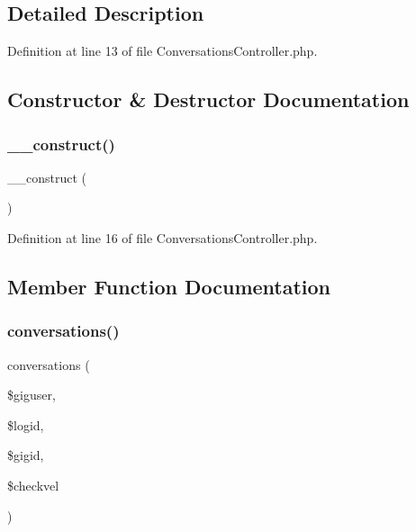 \subsection{Detailed Description}


Definition at line 13 of file Conversations\+Controller.\+php.



\subsection{Constructor \& Destructor Documentation}
\mbox{\label{class_responsive_1_1_http_1_1_controllers_1_1_conversations_controller_a095c5d389db211932136b53f25f39685}} 
\subsubsection{\texorpdfstring{\_\_construct()}{\_\_construct()}}
{\footnotesize\ttfamily \+\_\+\+\_\+construct (\begin{DoxyParamCaption}{ }\end{DoxyParamCaption})}



Definition at line 16 of file Conversations\+Controller.\+php.



\subsection{Member Function Documentation}
\mbox{\label{class_responsive_1_1_http_1_1_controllers_1_1_conversations_controller_a485a3199a3b013918780405a40c2a22a}} 
\subsubsection{\texorpdfstring{conversations()}{conversations()}}
{\footnotesize\ttfamily conversations (\begin{DoxyParamCaption}\item[{}]{\$giguser,  }\item[{}]{\$logid,  }\item[{}]{\$gigid,  }\item[{}]{\$checkvel }\end{DoxyParamCaption})}



